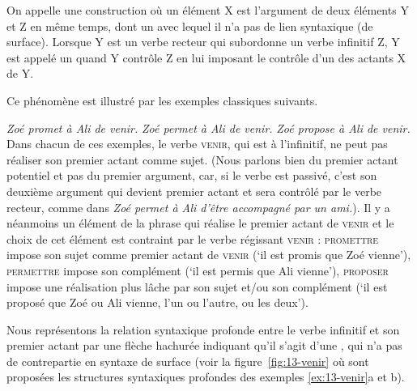 {On appelle  une construction où un élément X est l’argument de deux éléments Y et Z en même temps, dont un avec lequel il n’a pas de lien syntaxique (de surface). Lorsque Y est un verbe recteur qui subordonne un verbe infinitif Z, Y est appelé un  quand Y contrôle Z en lui imposant le contrôle d’un des actants X de Y.}

Ce phénomène est illustré par les exemples classiques suivants.

\ea\label{ex:13-venir}
\ea\textit{Zoé promet à Ali de venir.}
\ex\textit{Zoé permet à Ali de venir.}
\ex\textit{Zoé propose à Ali de venir.}\z\z
Dans chacun de ces exemples, le verbe \textsc{venir}, qui est à l’infinitif, ne peut pas réaliser son premier actant comme sujet. (Nous parlons bien du premier actant potentiel et pas du premier argument, car, si le verbe est passivé, c’est son deuxième argument qui devient premier actant et sera contrôlé par le verbe recteur, comme dans \textit{Zoé permet à Ali d’être accompagné par un ami.}). Il y a néanmoins un élément de la phrase qui réalise le premier actant de \textsc{venir} et le choix de cet élément est contraint par le verbe régissant \textsc{venir} : \textsc{promettre} impose son sujet comme premier actant de \textsc{venir}  (‘il est promis que Zoé vienne’), \textsc{permettre} impose son complément  (‘il est permis que Ali vienne’), \textsc{proposer} impose une réalisation plus lâche par son sujet et/ou son complément  (‘il est proposé que Zoé ou Ali vienne, l’un ou l’autre, ou les deux’).

Nous représentons la relation syntaxique profonde entre le verbe infinitif et son premier actant par une flèche hachurée indiquant qu’il s’agit d’une , qui n’a pas de contrepartie en syntaxe de surface (voir la figure~\ref{fig:13-venir} où sont proposées les structures syntaxiques profondes des exemples \ref{ex:13-venir}a et b).

